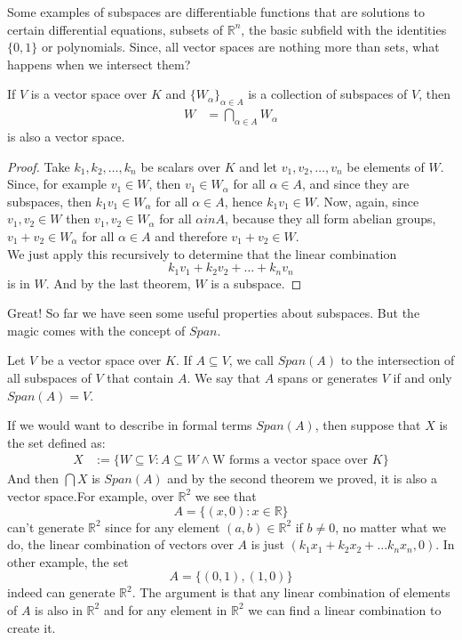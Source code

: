 \documentclass{tufte-handout}
\begin{document}
Some examples of subspaces are differentiable functions that are solutions to certain differential equations, subsets of $\mathbb{R}^{n}$, the basic subfield with the identities $\{0, 1\}$ or polynomials. Since, all vector spaces are nothing more than sets, what happens when we intersect them?

\begin{theorem}
	If $V$ is a vector space over $K$ and $\{W_\alpha\}_{\alpha \in A}$ is a collection of subspaces of $V$, then
	\begin{align*}
		W &= \bigcap_{\alpha \in A} W_\alpha
	\end{align*}
	is also a vector space.
\end{theorem}
\begin{proof}
	Take $k_1, k_2, \dots, k_n$ be scalars over $K$ and let $v_1, v_2, \dots, v_n$ be elements of $W$. Since, for example $v_1 \in W$, then $v_1 \in W_\alpha$ for all $\alpha \in A$, and since they are subspaces, then $k_1v_1 \in W_\alpha$ for all $\alpha \in A$, hence $k_1v_1 \in W$. Now, again, since $v_1, v_2 \in W$ then $v_1, v_2 \in W_\alpha$ for all $\alpha in A$, because they all form abelian groups, $v_1 + v_2 \in W_\alpha$ for all $\alpha \in A$ and therefore $v_1+v_2 \in W$.\\

	We just apply this recursively to determine that the linear combination $$k_1v_1 + k_2v_2 + \dots + k_nv_n$$ is in $W$. And by the last theorem, $W$ is a subspace.
\end{proof}

Great! So far we have seen some useful properties about subspaces. But the magic comes with the concept of $Span$. 

\begin{definition}
	Let $V$ be a vector space over $K$. If $A \subseteq V$, we call $Span(A)$ to the intersection of all subspaces of $V$ that contain $A$. We say that $A$ spans or generates $V$ if and only $Span(A) = V$.
\end{definition}

If we would want to describe in formal terms $Span(A)$, then suppose that $X$ is the set defined as:
\begin{align*}
	X &:= \{W \subseteq V:A \subseteq W \wedge \text{W forms a vector space over $K$}\}
\end{align*}
And then $\bigcap X$ is $Span(A)$ and by the second theorem we proved, it is also a vector space.For example, over $\mathbb{R}^2$ we see that $$A = \{(x, 0): x \in \mathbb{R}\}$$ can't generate $\mathbb{R}^2$ since for any element $(a, b) \in \mathbb{R}^2$ if $b \neq 0$, no matter what we do, the linear combination of vectors over $A$ is just $(k_1x_1 + k_2x_2 + \dots k_nx_n, 0)$. In other example, the set $$A = \{(0, 1), (1, 0)\}$$ indeed can generate $\mathbb{R}^2$. The argument is that any linear combination of elements of $A$ is also in $\mathbb{R}^2$ and for any element in $\mathbb{R}^2$ we can find a linear combination to create it.
\end{document}
